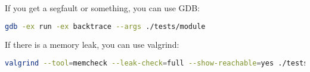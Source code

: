 \documentclass[12pt,a4paper]{article}
\begin{document}
If you get a segfault or something, you can use GDB:

\begin{lstlisting}[language=bash]
gdb -ex run -ex backtrace --args ./tests/module
\end{lstlisting}

If there is a memory leak, you can use valgrind:

\begin{lstlisting}[language=bash]
valgrind --tool=memcheck --leak-check=full --show-reachable=yes ./tests/module
\end{lstlisting}
\end{document}
